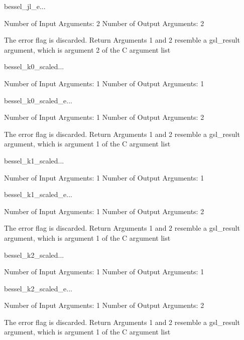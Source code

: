 \begin{funcdesc}{bessel_jl_e}{...}

    Number of Input  Arguments:  2
    Number of Output Arguments:  2

The error flag is discarded.
Return Arguments 1 and 2 resemble a gsl_result argument,
	which is  argument 2 of the C argument list

\end{funcdesc}

\begin{funcdesc}{bessel_k0_scaled}{...}

    Number of Input  Arguments:  1
    Number of Output Arguments:  1
\end{funcdesc}

\begin{funcdesc}{bessel_k0_scaled_e}{...}

    Number of Input  Arguments:  1
    Number of Output Arguments:  2

The error flag is discarded.
Return Arguments 1 and 2 resemble a gsl_result argument,
	which is  argument 1 of the C argument list

\end{funcdesc}

\begin{funcdesc}{bessel_k1_scaled}{...}

    Number of Input  Arguments:  1
    Number of Output Arguments:  1
\end{funcdesc}

\begin{funcdesc}{bessel_k1_scaled_e}{...}

    Number of Input  Arguments:  1
    Number of Output Arguments:  2

The error flag is discarded.
Return Arguments 1 and 2 resemble a gsl_result argument,
	which is  argument 1 of the C argument list

\end{funcdesc}

\begin{funcdesc}{bessel_k2_scaled}{...}

    Number of Input  Arguments:  1
    Number of Output Arguments:  1
\end{funcdesc}

\begin{funcdesc}{bessel_k2_scaled_e}{...}

    Number of Input  Arguments:  1
    Number of Output Arguments:  2

The error flag is discarded.
Return Arguments 1 and 2 resemble a gsl_result argument,
	which is  argument 1 of the C argument list

\end{funcdesc}

